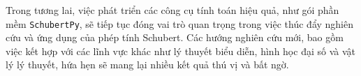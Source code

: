 \documentclass[conference,a4paper]{IEEEtran}
\begin{document}
Trong tương lai, việc phát triển các công cụ tính toán hiệu quả, như gói phần mềm \texttt{SchubertPy}, sẽ tiếp tục đóng vai trò quan trọng trong việc thúc đẩy nghiên cứu và ứng dụng của phép tính Schubert. Các hướng nghiên cứu mới, bao gồm việc kết hợp với các lĩnh vực khác như lý thuyết biểu diễn, hình học đại số và vật lý lý thuyết, hứa hẹn sẽ mang lại nhiều kết quả thú vị và bất ngờ.





\nocite{graysonschubert2}
\nocite{hiep2014schubert3}
\nocite{katz1992schubert}
\nocite{Kontsevich_1994}
\nocite{PythonTyping2023}
\nocite{PythonUnittestLib}
\nocite{SageMath2024}
\nocite{schubert1879kalkul}
\nocite{Hiep2014IntersectionTheory}
\nocite{Van2024BatBienDaiTap}

\vspace{7pt}




\appendix







\end{document}
